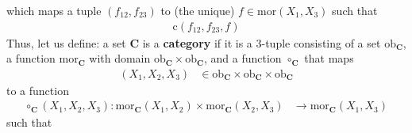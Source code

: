 which maps a tuple $(f_{12},f_{23})$ to (the unique) $f  \in \mathrm{mor}(X_{1},X_{3})$ such that
\begin{align*}
\mathrm{c}(f_{12},f_{23},f)
\end{align*}
Thus, let us define: a set $\mathbf{C}$ is a \textbf{category} if it is a $3$-tuple consisting of a set $\mathrm{ob}_{\mathbf{C}}$, a function $\mathrm{mor}_{\mathbf{C}}$ with domain $\mathrm{ob}_{\mathbf{C}} \times \mathrm{ob}_{\mathbf{C}}$, and a function $\circ_{\mathbf{C}}$ that maps
\begin{align*}
  (X_{1},X_{2},X_{3})
  &\in
  \mathrm{ob}_{\mathbf{C}}
  \times
  \mathrm{ob}_{\mathbf{C}}
  \times
  \mathrm{ob}_{\mathbf{C}}
\end{align*}
to a function
\begin{align*}
  \circ_{\mathbf{C}}(X_{1},X_{2},X_{3})
  \colon
  \mathrm{mor}_{\mathbf{C}}(X_{1},X_{2})
  \times
  \mathrm{mor}_{\mathbf{C}}(X_{2},X_{3})
  &\rightarrow
  \mathrm{mor}_{\mathbf{C}}(X_{1},X_{3})
\end{align*}
such that
